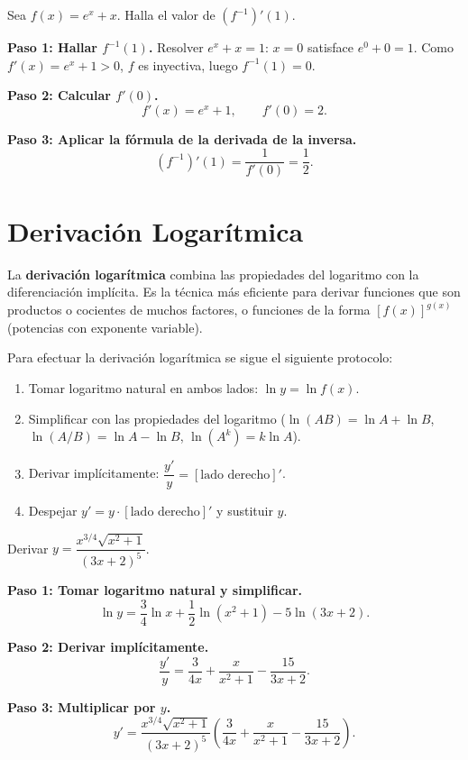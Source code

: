 \begin{example}[Derivada de la función inversa: $f(x)=e^x+x$]
Sea $f(x) = e^x + x$. Halla el valor de $(f^{-1})'(1)$.

\begin{myproof}

\textbf{Paso 1: Hallar $f^{-1}(1)$.}
Resolver $e^x + x = 1$: $x=0$ satisface $e^0+0=1$. Como $f'(x)=e^x+1>0$, $f$ es inyectiva, luego $f^{-1}(1)=0$.

\textbf{Paso 2: Calcular $f'(0)$.}
\[
    f'(x) = e^x + 1, \qquad f'(0) = 2.
\]

\textbf{Paso 3: Aplicar la fórmula de la derivada de la inversa.}
\[
    \boxed{(f^{-1})'(1) = \frac{1}{f'(0)} = \frac{1}{2}.}
\]
\end{myproof}
\end{example}

\section{Derivación Logarítmica}

La \textbf{derivación logarítmica} combina las propiedades del logaritmo con la diferenciación implícita. Es la técnica más eficiente para derivar funciones que son productos o cocientes de muchos factores, o funciones de la forma $[f(x)]^{g(x)}$ (potencias con exponente variable).

\begin{rem} Para efectuar la derivación logarítmica se sigue el siguiente protocolo:
\begin{enumerate}
    \item Tomar logaritmo natural en ambos lados: $\ln y = \ln f(x)$.
    \item Simplificar con las propiedades del logaritmo
    ($\ln(AB)=\ln A+\ln B$, $\ln(A/B)=\ln A-\ln B$, $\ln(A^k)=k\ln A$).
    \item Derivar implícitamente: $\dfrac{y'}{y} = [\text{lado derecho}]'$.
    \item Despejar $y' = y\cdot[\text{lado derecho}]'$ y sustituir $y$.
\end{enumerate}
\end{rem}

\begin{example}
Derivar $y = \dfrac{x^{3/4}\sqrt{x^2+1}}{(3x+2)^5}$.

\begin{myproof}

\textbf{Paso 1: Tomar logaritmo natural y simplificar.}
\[
\ln y = \frac{3}{4}\ln x + \frac{1}{2}\ln(x^2+1) - 5\ln(3x+2).
\]

\textbf{Paso 2: Derivar implícitamente.}
\[
\frac{y'}{y} = \frac{3}{4x} + \frac{x}{x^2+1} - \frac{15}{3x+2}.
\]

\textbf{Paso 3: Multiplicar por $y$.}
\[
\boxed{y' = \frac{x^{3/4}\sqrt{x^2+1}}{(3x+2)^5}
\left(\frac{3}{4x} + \frac{x}{x^2+1} - \frac{15}{3x+2}\right).}
\]
\end{myproof}
\end{example}

